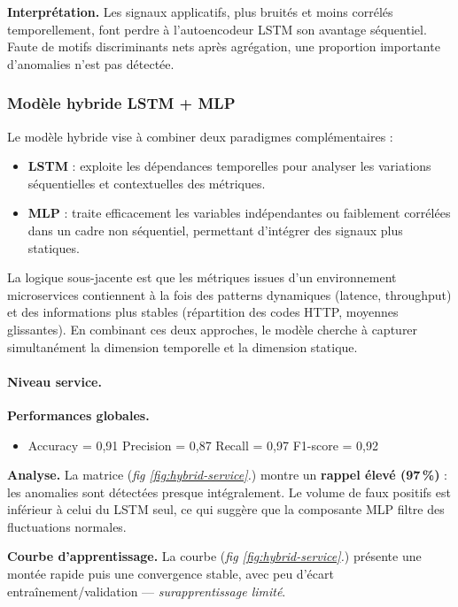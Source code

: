 \documentclass[conference]{IEEEtran}
\begin{document}
\textbf{Interprétation.}
Les signaux applicatifs, plus bruités et moins corrélés temporellement, font perdre à l’autoencodeur LSTM son avantage séquentiel.  
Faute de motifs discriminants nets après agrégation, une proportion importante d’anomalies n’est pas détectée.
\FloatBarrier


\subsubsection{\textbf{Modèle hybride LSTM + MLP}}

Le modèle hybride vise à combiner deux paradigmes complémentaires :
\begin{itemize}
    \item \textbf{LSTM} : exploite les dépendances temporelles pour analyser les variations séquentielles et contextuelles des métriques.
    \item \textbf{MLP} : traite efficacement les variables indépendantes ou faiblement corrélées dans un cadre non séquentiel, permettant d’intégrer des signaux plus statiques.
\end{itemize}
La logique sous-jacente est que les métriques issues d’un environnement microservices contiennent à la fois des patterns dynamiques (latence, throughput) et des informations plus stables (répartition des codes HTTP, moyennes glissantes). En combinant ces deux approches, le modèle cherche à capturer simultanément la dimension temporelle et la dimension statique.

\paragraph{Niveau service.}


\textbf{Performances globales.}
\begin{itemize}
    \item Accuracy = 0{,}91 \quad
          Precision = 0{,}87 \quad
          Recall = 0{,}97 \quad
          F1-score = 0{,}92
\end{itemize}

\textbf{Analyse.}
La matrice (\textit{fig \ref{fig:hybrid-service}.}) montre un \textbf{rappel élevé (97\,\%)} : les anomalies sont détectées presque intégralement.  
Le volume de faux positifs est inférieur à celui du LSTM seul, ce qui suggère que la composante MLP filtre des fluctuations normales.

\textbf{Courbe d’apprentissage.}
La courbe (\textit{fig \ref{fig:hybrid-service}.}) présente une montée rapide puis une convergence stable, avec peu d’écart entraînement/validation — \emph{surapprentissage limité}.
\end{document}
